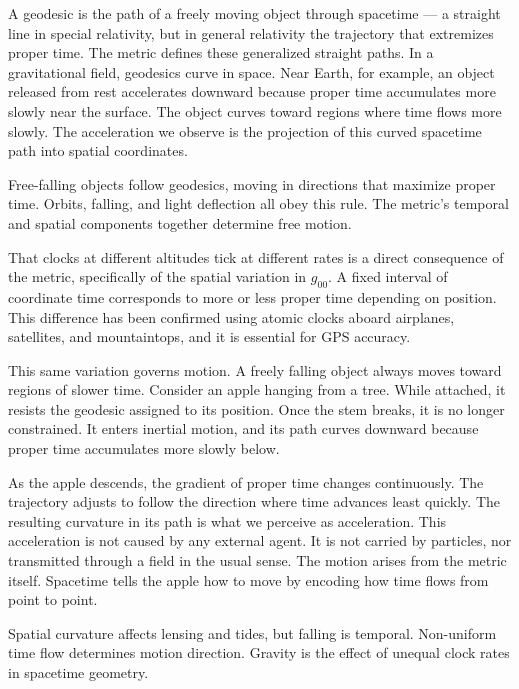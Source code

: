 A geodesic is the path of a freely moving object through spacetime — a straight line in special relativity, but in general relativity the trajectory that extremizes proper time. The metric defines these generalized straight paths. In a gravitational field, geodesics curve in space. Near Earth, for example, an object released from rest accelerates downward because proper time accumulates more slowly near the surface. The object curves toward regions where time flows more slowly. The acceleration we observe is the projection of this curved spacetime path into spatial coordinates.

Free-falling objects follow geodesics, moving in directions that maximize proper time. Orbits, falling, and light deflection all obey this rule. The metric's temporal and spatial components together determine free motion.

That clocks at different altitudes tick at different rates is a direct consequence of the metric, specifically of the spatial variation in \( g_{00} \). A fixed interval of coordinate time corresponds to more or less proper time depending on position. This difference has been confirmed using atomic clocks aboard airplanes, satellites, and mountaintops, and it is essential for GPS accuracy.

This same variation governs motion. A freely falling object always moves toward regions of slower time. Consider an apple hanging from a tree. While attached, it resists the geodesic assigned to its position. Once the stem breaks, it is no longer constrained. It enters inertial motion, and its path curves downward because proper time accumulates more slowly below.

As the apple descends, the gradient of proper time changes continuously. The trajectory adjusts to follow the direction where time advances least quickly. The resulting curvature in its path is what we perceive as acceleration. This acceleration is not caused by any external agent. It is not carried by particles, nor transmitted through a field in the usual sense. The motion arises from the metric itself. Spacetime tells the apple how to move by encoding how time flows from point to point.

Spatial curvature affects lensing and tides, but falling is temporal. Non-uniform time flow determines motion direction. Gravity is the effect of unequal clock rates in spacetime geometry.


